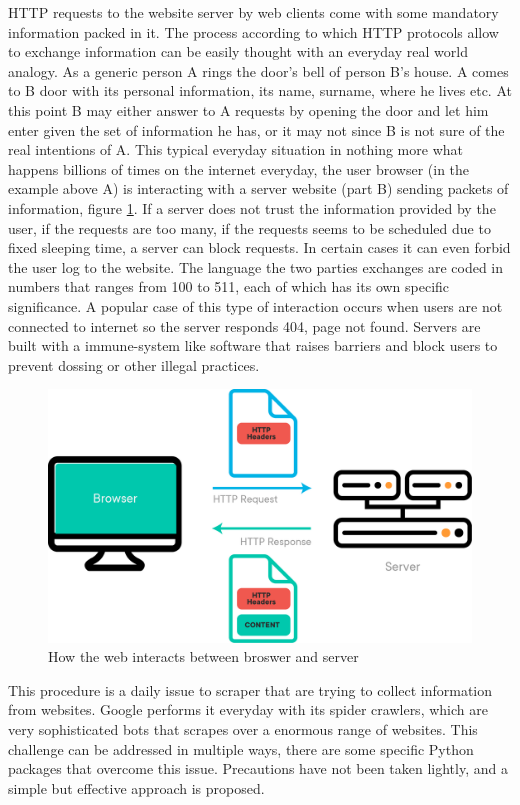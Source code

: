 \documentclass[
  12pt,
  a4paper,
  oneside]{book}
\theoremstyle{definition}
\theoremstyle{definition}
\theoremstyle{definition}
\theoremstyle{remark}
\begin{document}
HTTP requests to the website server by web clients come with some mandatory information packed in it. The process according to which HTTP protocols allow to exchange information can be easily thought with an everyday real world analogy. As a generic person A rings the door's bell of person B's house. A comes to B door with its personal information, its name, surname, where he lives etc. At this point B may either answer to A requests by opening the door and let him enter given the set of information he has, or it may not since B is not sure of the real intentions of A. This typical everyday situation in nothing more what happens billions of times on the internet everyday, the user browser (in the example above A) is interacting with a server website (part B) sending packets of information, figure \ref{fig:webworks}. If a server does not trust the information provided by the user, if the requests are too many, if the requests seems to be scheduled due to fixed sleeping time, a server can block requests. In certain cases it can even forbid the user log to the website. The language the two parties exchanges are coded in numbers that ranges from 100 to 511, each of which has its own specific significance. A popular case of this type of interaction occurs when users are not connected to internet so the server responds 404, page not found. Servers are built with a immune-system like software that raises barriers and block users to prevent dossing or other illegal practices.

\begin{figure}
\centering
\includegraphics{images/how_web_works.png}
\caption{\label{fig:webworks}How the web interacts between broswer and server}
\end{figure}

This procedure is a daily issue to scraper that are trying to collect information from websites. Google performs it everyday with its spider crawlers, which are very sophisticated bots that scrapes over a enormous range of websites. This challenge can be addressed in multiple ways, there are some specific Python packages that overcome this issue. Precautions have not been taken lightly, and a simple but effective approach is proposed.
\end{document}
